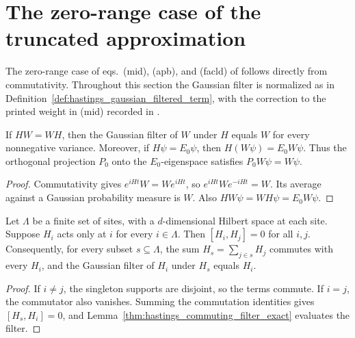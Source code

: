 \section{The zero-range case of the truncated approximation}
\label{sec:hastings_zero_range}

The zero-range case of eqs.~(mid), (apb), and (facld) of
\cite[lines 285--348]{Hastings2006Solving} follows directly from commutativity.
Throughout this section the Gaussian filter is normalized as in
Definition~\ref{def:hastings_gaussian_filtered_term}, with the correction to
the printed weight in (mid) recorded in
\cite{gap:hastings05_truncated_dynamics}.

\begin{lemma}
    \label{thm:hastings_commuting_filter_exact}
    \leanok
    If $HW=WH$, then the Gaussian filter of $W$ under $H$ equals $W$ for
    every nonnegative variance. Moreover, if $H\psi=E_0\psi$, then
    $H(W\psi)=E_0W\psi$. Thus the orthogonal projection $P_0$ onto the
    $E_0$-eigenspace satisfies $P_0W\psi=W\psi$.
\end{lemma}
\begin{proof}\leanok
    Commutativity gives $e^{iHt}W=We^{iHt}$, so
    $e^{iHt}We^{-iHt}=W$. Its average against a Gaussian probability
    measure is $W$. Also $HW\psi=WH\psi=E_0W\psi$.
\end{proof}

\begin{lemma}
    \label{thm:hastings_single_site_terms_commute}
    \leanok
    Let $\Lambda$ be a finite set of sites, with a $d$-dimensional Hilbert
    space at each site. Suppose $H_i$ acts only at $i$ for every $i\in\Lambda$.
    Then $[H_i,H_j]=0$ for all $i,j$. Consequently, for every subset
    $s\subseteq\Lambda$, the sum $H_s=\sum_{j\in s}H_j$ commutes with every
    $H_i$, and the Gaussian filter of $H_i$ under $H_s$ equals $H_i$.
\end{lemma}
\begin{proof}\leanok
    If $i\ne j$, the singleton supports are disjoint, so the terms commute.
    If $i=j$, the commutator also vanishes. Summing the commutation
    identities gives $[H_s,H_i]=0$, and
    Lemma~\ref{thm:hastings_commuting_filter_exact} evaluates the filter.
\end{proof}

